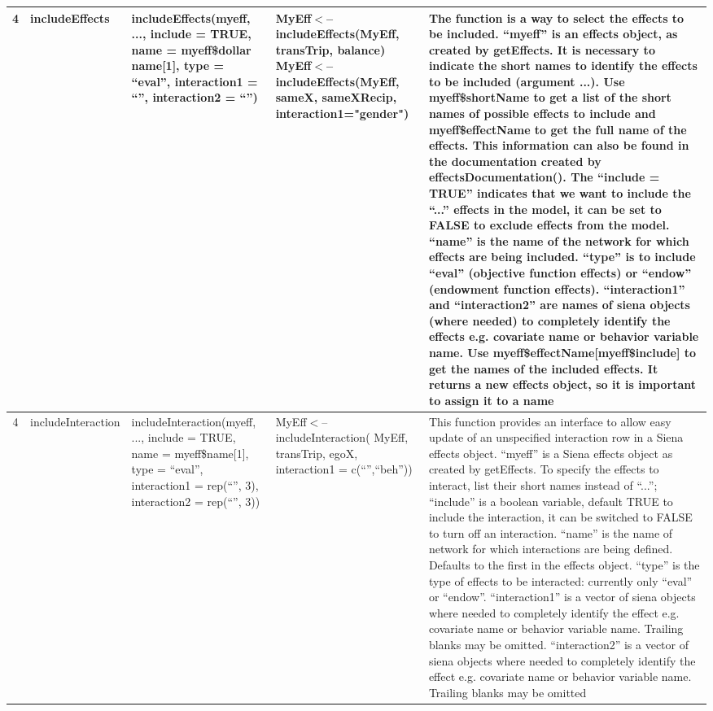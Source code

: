 \documentclass[a4paper,fleqn]{article}
\newcommand{\+}{\, + \,}
\begin{document}
{\begin{landscape}
\begin{footnotesize}
\begin{longtable}{c | p{3cm} | p{5.2cm} | p{4.2cm} | p{8.5cm} }
4 & includeEffects & includeEffects(myeff, ..., include = TRUE, name =
myeff\$dollar name[1], type = ``eval'', interaction1 = ``'', interaction2 =
``'') & {MyEff$<$--includeEffects(MyEff, transTrip, balance) \flushleft
MyEff$<$--includeEffects(MyEff, sameX, sameXRecip, interaction1="gender")}
 &The function is a
way to select the effects to be included. ``myeff'' is an effects object, as
created by getEffects. It is necessary to indicate the short names to identify
the effects to be included (argument ...). Use myeff\$shortName to get a list of
the short names of possible effects to include and myeff\$effectName to get the
full name of the effects. This information can also be found in the
documentation
created by effectsDocumentation(). The ``include = TRUE'' indicates that we want
to
include the ``...'' effects in the model, it can be set to FALSE to exclude
effects from the model. ``name'' is the name of the network for which effects
are being included. ``type'' is to include ``eval'' (objective function effects)
or ``endow'' (endowment function effects). ``interaction1'' and ``interaction2''
are names of siena objects (where needed) to completely identify the effects
e.g. covariate name or behavior variable name. Use
myeff\$effectName[myeff\$include]
to get the names of the included effects. It returns a
new effects object, so it is important to assign it to a
name\\
\hline

4   & includeInteraction &  includeInteraction(myeff, ..., include = TRUE, name
= myeff\$name[1], type  = ``eval'', interaction1 = rep(``'', 3), interaction2 =
rep(``'', 3)) &  MyEff$<$--includeInteraction( MyEff, transTrip, egoX,
interaction1 = c(``'',``beh''))     &This function provides an interface to
allow easy update of  an unspecified interaction row in a Siena effects
object. ``myeff'' is  a Siena  effects object as created by getEffects. To
specify the effects to interact,  list their short names instead of ``...'';
``include'' is a boolean variable,  default TRUE to include the interaction, it
can be switched to FALSE to turn off  an interaction. ``name'' is the name of
network for which interactions are being  defined. Defaults to the first in the
effects object. ``type'' is the type of  effects to be interacted: currently
only ``eval'' or ``endow''. ``interaction1''  is a vector of siena objects where
needed to completely identify the effect e.g.  covariate name or behavior
variable name. Trailing blanks may be omitted.  ``interaction2''  is a vector of
siena objects where needed to completely  identify the effect e.g. covariate
name or behavior variable name.  Trailing blanks may be omitted\\
\hline


\end{longtable}
\end{footnotesize}
\end{landscape}}
\end{document}
